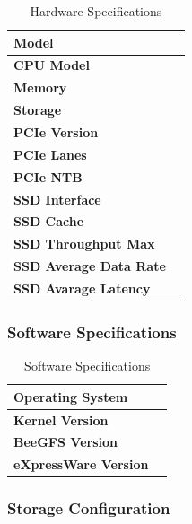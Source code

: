 \begin{table}[H]
    \centering
    \caption{Hardware Specifications}
    \label{tab:node_specs}
    \begin{tabularx}{\textwidth}{|X|X|}
        \hline
        \textbf{Model} &  \\
        \hline
        \textbf{CPU Model} &  \\
        \hline
        \textbf{Memory} &  \\
        \hline
        \textbf{Storage} & \\
        \hline
        \textbf{PCIe Version} &  \\
        \hline
        \textbf{PCIe Lanes} &  \\
        \hline
        \textbf{PCIe NTB} & \\
        \hline
        \textbf{SSD Interface} & \\
        \hline
        \textbf{SSD Cache} &  \\
        \hline
        \textbf{SSD Throughput Max} &  \\
        \hline
        \textbf{SSD Average Data Rate} &  \\
        \hline
        \textbf{SSD Avarage Latency} & \\
        \hline
    \end{tabularx}
\end{table}

\subsubsection{Software Specifications}

\begin{table}[H]
    \centering
    \caption{Software Specifications}
    \label{tab:software_specs}
    \begin{tabularx}{\textwidth}{|X|X|}
        \hline

        \textbf{Operating System} &  \\
        \hline
        \textbf{Kernel Version} &  \\
        \hline
        \textbf{BeeGFS Version} & \\ %
        \hline
        \textbf{eXpressWare Version} &  \\
        \hline
    \end{tabularx}
\end{table}

\subsubsection{Storage Configuration}

